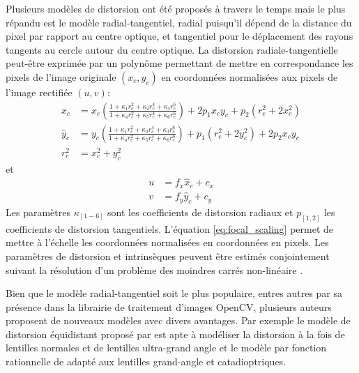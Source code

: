 Plusieurs modèles de distorsion ont été proposés à travers le temps mais le plus répandu est le modèle radial-tangentiel, radial puisqu'il dépend de la distance du pixel par rapport au centre optique, et tangentiel pour le déplacement des rayons tangents au cercle autour du centre optique. La distorsion radiale-tangentielle peut-être exprimée par un polynôme permettant de mettre en correspondance les pixels de l'image originale $(x_c, y_c)$ en coordonnées normalisées aux pixels de l'image rectifiée $(u, v)$:
\begin{equation}
  \begin{aligned}
    \hat{x}_c &= x_c\left(\frac{1 + \kappa_1r_c^2 + \kappa_2r_c^4 + \kappa_3r_c^6}{1 + \kappa_4r_c^2 + \kappa_5r_c^4 + \kappa_6r_c^6}\right) + 2p_1 x_c y_c + p_2(r_c^2 + 2 x_c^2) \\
    \hat{y}_c &= y_c\left(\frac{1 + \kappa_1r_c^2 + \kappa_2r_c^4 + \kappa_3r_c^6}{1 + \kappa_4r_c^2 + \kappa_5r_c^4 + \kappa_6r_c^6}\right) + p_1 (r_c^2 + 2 y_c^2) + 2p_2 x_c y_c \\
    r_c^2     &= x_c^2 + y_c^2
    \label{eq:rectification}
  \end{aligned}
\end{equation}
et
\begin{equation}
  \begin{aligned}
    u & = f_x \hat{x}_c + c_x\\
    v &= f_y \hat{y}_c + c_y
    \label{eq:focal_scaling}
  \end{aligned}
\end{equation}
Les paramètres $\kappa_{[1-6]}$ sont les coefficients de distorsion radiaux et $p_{[1,2]}$ les coefficients de distorsion tangentiels. L'équation \ref{eq:focal_scaling} permet de mettre à l'échelle les coordonnées normalisées en coordonnées en pixels. Les paramètres de distorsion et intrinsèques peuvent être estimés conjointement suivant la résolution d'un problème des moindres carrés non-linéaire \citep{Zhang2000}.

Bien que le modèle radial-tangentiel soit le plus populaire, entres autres par sa présence dans la librairie de traitement d'images OpenCV, plusieurs auteurs proposent de nouveaux modèles avec divers avantages. Par exemple le modèle de distorsion équidistant proposé par \cite{Kannala2006} est apte à modéliser la distorsion à la fois de lentilles normales et de lentilles ultra-grand angle et le modèle par fonction rationnelle de \cite{Claus2005} adapté aux lentilles grand-angle et catadioptriques.

